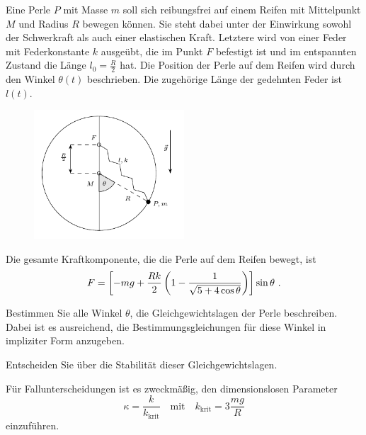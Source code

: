 \begin{atiTask}[
  title = Gleichgewichtspunkte und kleine Schwingungen
]
  Eine Perle $P$ mit Masse $m$ soll sich reibungsfrei auf einem Reifen mit Mittelpunkt $M$ und Radius $R$ bewegen können.
  Sie steht dabei unter der Einwirkung sowohl der Schwerkraft als auch einer elastischen Kraft.
  Letztere wird von einer Feder mit Federkonstante $k$ ausgeübt, die im Punkt $F$ befestigt ist und im entspannten Zustand die Länge $l_0 = \frac{R}{2}$ hat.
  Die Position der Perle auf dem Reifen wird durch den Winkel $\theta(t)$ beschrieben.
  Die zugehörige Länge der gedehnten Feder ist $l(t)$.
  \begin{figure}[H]
    \center
    \includegraphics[width=0.5\textwidth]{task-gleichgewichtspunkte_und_kleine_schwingungen-sketch.pdf}
  \end{figure}
  Die gesamte Kraftkomponente, die die Perle auf dem Reifen bewegt, ist
  \[
    F = \left[ -mg + \frac{Rk}{2}\left( 1 - \frac{1}{\sqrt{5 + 4\cos \theta}} \right) \right]\sin \theta \ .
  \]
  \begin{atiSubtasks}
    \item{
      Bestimmen Sie alle Winkel $\theta$, die Gleichgewichtslagen der Perle beschreiben.
      Dabei ist es ausreichend, die Bestimmungsgleichungen für diese Winkel in impliziter Form anzugeben.
    }
    \item{
      Entscheiden Sie über die Stabilität dieser Gleichgewichtslagen.

      \begin{atiNote}
        Für Fallunterscheidungen ist es zweckmäßig, den dimensionslosen Parameter
        \[
          \kappa = \frac{k}{k_\text{krit}} \quad \text{mit} \quad k_\text{krit} = 3\frac{mg}{R}
        \]
        einzuführen.
      \end{atiNote}
    }
  \end{atiSubtasks}
\end{atiTask}